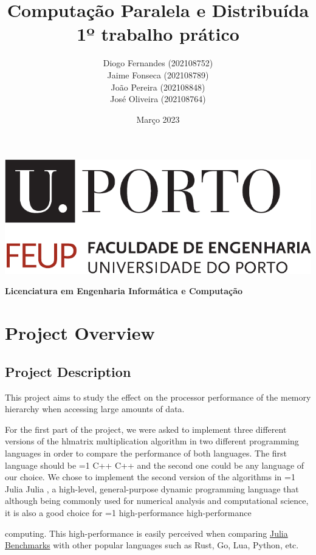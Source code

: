\documentclass[11pt,a4paper]{article}
\title{%
  Computação Paralela e Distribuída \\
  \large 1º trabalho prático}
\author{%
        Diogo Fernandes (202108752) \\ 
        Jaime Fonseca (202108789) \\
        João Pereira (202108848) \\
        José Oliveira (202108764) \\
        }
\date{Março 2023}
\newcommand{\hl}[2][1]{%
  \ifnum#1=1\relax
    \textcolor{text-hl1}{#2}%
  \else
    \textcolor{text-hl2}{#2}%
  \fi
}
\def\course{Licenciatura em Engenharia Informática e Computação}
\begin{document}
    
\begin{titlepage}
    \begin{center}
        \includegraphics[width=0.8\linewidth]{images/uporto-feup.pdf} 
        \vspace{1cm}

        \LARGE
        \textbf{\thetitle}
        \vfill

        \large
        \textbf{\course}
        \vspace{0.5cm}

        \large
        \textbf{\theauthor}
        \vspace{0.5cm}

        \large
        \thedate
    \end{center}
\end{titlepage}

\tableofcontents

\section{Project Overview}

\subsection{Project Description}
This project aims to study the effect on the processor performance of the memory 
hierarchy when accessing large amounts of data.

For the first part of the project, we were asked to implement three different versions of 
the hl{matrix multiplication algorithm} in two different programming languages in order to compare 
the performance of both languages. The first language should be \hl{C++} and the second one could be 
any language of our choice. We chose to implement the second version of the algorithms in \hl{Julia},
a high-level, general-purpose dynamic programming language that although being commonly used for 
numerical analysis and computational science, it is also a good choice for \hl[2]{high-performance} 
computing. This high-performance is easily perceived when comparing 
\href{https://julialang.org/benchmarks/}{Julia Benchmarks} with other popular languages such as 
Rust, Go, Lua, Python, etc.
\end{document}
